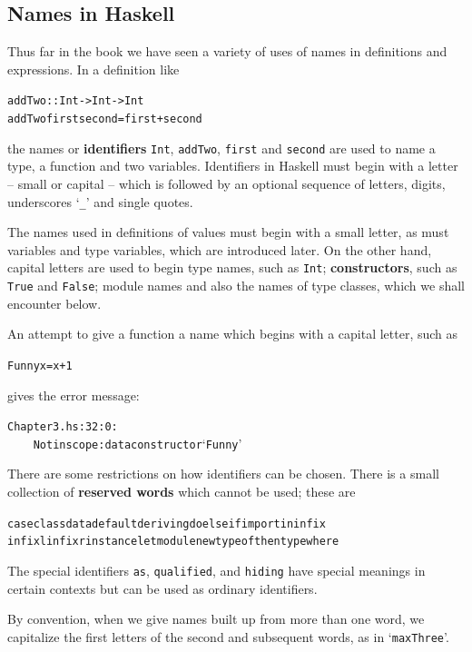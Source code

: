 \subsection*{Names in Haskell}

Thus far in the book we have seen a variety of uses of names in definitions
and expressions. In a definition like
\begin{alltt}
addTwo :: Int -> Int -> Int
addTwo first second = first+second
\end{alltt}
the names or \textbf{identifiers} 
\texttt{Int}, \texttt{addTwo}, \texttt{first} and \texttt{second} are used to
name a type, a function and two variables. Identifiers in Haskell must begin
with a letter -- small or capital -- which is followed by an optional
sequence of letters, digits, underscores `\verb+_+' and single quotes.

The names used in definitions of values must
begin with a small letter, as must variables
and type
variables, which are introduced later. On the other hand, 
capital letters are used to begin
type names, such as \texttt{Int}; \textbf{constructors}, such as
\texttt{True} and \texttt{False}; module names and also the names of  
type classes, which we shall encounter
below.

An attempt to give a function a name
which begins with a capital letter, such as
\begin{alltt}
Funny x = x+1
\end{alltt}
gives the error message:
\begin{alltt}
Chapter3.hs:32:0:
\ \ \ \ Not in scope: data constructor `Funny'
\end{alltt}
There are some restrictions on how identifiers can be chosen. There is
a small collection of \textbf{reserved words} which cannot be used; these
are
\begin{alltt}
case class data default deriving do else if import in infix
infixl infixr instance let module newtype of then type where
\end{alltt}
The special identifiers \texttt{as}, \texttt{qualified}, and
\texttt{hiding} 
have special meanings in certain contexts but can be
used as ordinary identifiers.

By convention, when we give names built up from more than one word, we
capitalize the first letters of the second and subsequent words, as in 
`\texttt{maxThree}'.

